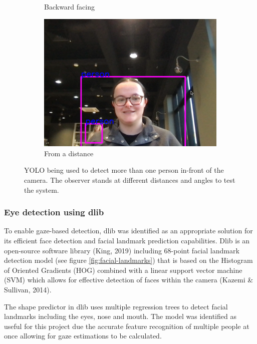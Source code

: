 \documentclass[12pt]{article}
\theoremstyle{plain}
\theoremstyle{definition}
\begin{document}
\begin{figure}[h!]
\begin{subfigure}[b]{0.3\textwidth}
         \caption{Backward facing}
         \label{fig:b}
     \end{subfigure}
     \hfill
     \begin{subfigure}[b]{0.3\textwidth}
         \centering
         \includegraphics[width=\textwidth]{img/fig1-img3.png}
         \caption{From a distance}
         \label{fig:c}
     \end{subfigure}
        \caption{YOLO being used to detect more than one person in-front of the camera. The observer stands at different distances and angles to test the system.}
        \label{fig:yolo}
\end{figure}

\subsubsection{Eye detection using dlib}
\label{dlib}

To enable gaze-based detection, dlib was identified as an appropriate solution for its efficient face detection and facial landmark prediction capabilities. Dlib is an open-source software library (King, 2019) including 68-point facial landmark detection model (see figure \ref{fig:facial-landmarks}) that is based on the Histogram of Oriented Gradients (HOG) combined with a linear support vector machine (SVM) which allows for effective detection of faces within the camera (Kazemi & Sullivan, 2014).

The shape predictor in dlib uses multiple regression trees to detect facial landmarks including the eyes, nose and mouth. The model was identified as useful for this project due the accurate feature recognition of multiple people at once allowing for gaze estimations to be calculated.
\end{document}
